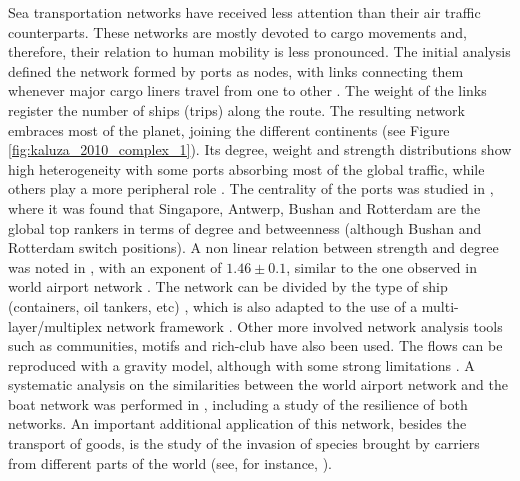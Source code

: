 Sea transportation networks have received less attention than their air traffic counterparts. These networks are mostly devoted to cargo movements and, therefore, their relation to human mobility is less pronounced. The initial analysis defined the network formed by ports as nodes, with links connecting them whenever major cargo liners travel from one to other \cite{fremont_2007_global}. The weight of the links register the number of ships (trips) along the route. The resulting network embraces most of the planet, joining the different continents (see Figure \ref{fig:kaluza_2010_complex_1}). Its degree, weight and strength distributions show high heterogeneity with some ports absorbing most of the global traffic, while others play a more peripheral role \cite{hu_2009_empirical,kaluza_2010_complex}. The centrality of the ports was studied in \cite{hu_2009_empirical}, where it was found that Singapore, Antwerp, Bushan and Rotterdam are the global top rankers in terms of degree and betweenness (although Bushan and Rotterdam switch positions). A non linear relation between strength and degree was noted in \cite{kaluza_2010_complex}, with an exponent of $1.46 \pm 0.1$, similar to the one observed in world airport network \cite{barrat_2004_architecture}. The network can be divided by the type of ship (containers, oil tankers, etc) \cite{kaluza_2010_complex}, which is also adapted to the use of a multi-layer/multiplex network framework \cite{ducruet_2013_network}. Other more involved network analysis tools such as communities, motifs \cite{kaluza_2010_complex} and rich-club \cite{ducruet_2013_network} have also been used. The flows can be reproduced with a gravity model, although with some strong limitations  \cite{kaluza_2010_complex}. A systematic analysis on the similarities between the world airport network and the boat network was performed in \cite{woolley-meza_2011_complexity}, including a study of the resilience of both networks. An important additional application of this network, besides the transport of goods, is the study of the invasion of species brought by carriers from different parts of the world (see, for instance, \cite{kaluza_2010_complex,keller_2010_linking,seebens_2013_risk}).





























